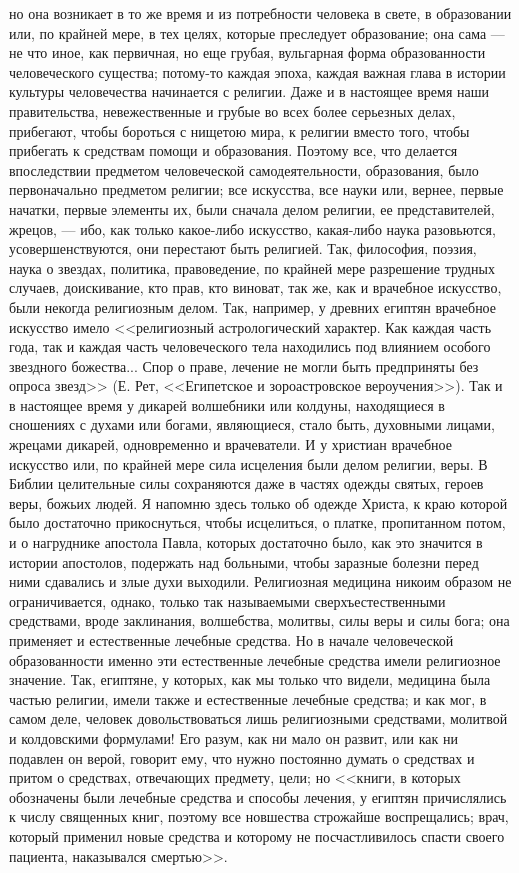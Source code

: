 \documentclass[12pt]{article}
\begin{document}
но она возникает в то же время и из потребности человека в свете, в образовании или, по крайней мере, в тех целях, которые преследует образование; она сама --- не что иное, как первичная, но еще грубая, вульгарная форма образованности человеческого существа; потому-то каждая эпоха, каждая важная глава в истории культуры человечества начинается с религии. Даже и в настоящее время наши правительства, невежественные и грубые во всех более серьезных делах, прибегают, чтобы бороться с нищетою мира, к религии вместо того, чтобы прибегать к средствам помощи и образования. Поэтому все, что делается впоследствии предметом человеческой самодеятельности, образования, было первоначально предметом религии; все искусства, все науки или, вернее, первые начатки, первые элементы их, были сначала делом религии, ее представителей, жрецов, --- ибо, как только какое-либо искусство, какая-либо наука разовьются, усовершенствуются, они перестают быть религией. Так, философия, поэзия, наука о звездах, политика, правоведение, по крайней мере разрешение трудных случаев, доискивание, кто прав, кто виноват, так же, как и врачебное искусство, были некогда религиозным делом. Так, например, у древних египтян врачебное искусство имело <<религиозный астрологический характер. Как каждая часть года, так и каждая часть человеческого тела находились под влиянием особого звездного божества... Спор о праве, лечение не могли быть предприняты без опроса звезд>> (Е. Рет, <<Египетское и зороастровское вероучения>>). Так и в настоящее время у дикарей волшебники или колдуны, находящиеся в сношениях с духами или богами, являющиеся, стало быть, духовными лицами, жрецами дикарей, одновременно и врачеватели. И у христиан врачебное искусство или, по крайней мере сила исцеления были делом религии, веры. В Библии целительные силы сохраняются даже в частях одежды святых, героев веры, божьих людей. Я напомню здесь только об одежде Христа, к краю которой было достаточно прикоснуться, чтобы исцелиться, о платке, пропитанном потом, и о нагруднике апостола Павла, которых достаточно было, как это значится в истории апостолов, подержать над больными, чтобы заразные болезни перед ними сдавались и злые духи выходили. Религиозная медицина никоим образом не ограничивается, однако, только так называемыми сверхъестественными средствами, вроде заклинания, волшебства, молитвы, силы веры и силы бога; она применяет и естественные лечебные средства. Но в начале человеческой образованности именно эти естественные лечебные средства имели религиозное значение. Так, египтяне, у которых, как мы только что видели, медицина была частью религии, имели также и естественные лечебные средства; и как мог, в самом деле, человек довольствоваться лишь религиозными средствами, молитвой и колдовскими формулами! Его разум, как ни мало он развит, или как ни подавлен он верой, говорит ему, что нужно постоянно думать о средствах и притом о средствах, отвечающих предмету, цели; но <<книги, в которых обозначены были лечебные средства и способы лечения, у египтян причислялись к числу священных книг, поэтому все новшества строжайше воспрещались; врач, который применил новые средства и которому не посчастливилось спасти своего пациента, наказывался смертью>>. 
\end{document}
